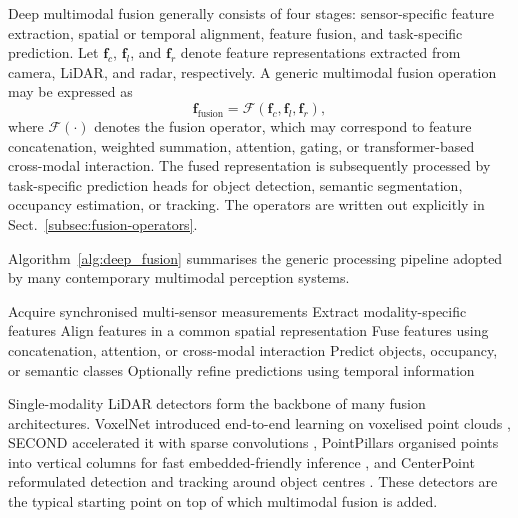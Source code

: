 Deep multimodal fusion generally consists of four stages: sensor-specific feature extraction, spatial or temporal alignment, feature fusion, and task-specific prediction. Let $\mathbf{f}_c$, $\mathbf{f}_l$, and $\mathbf{f}_r$ denote feature representations extracted from camera, LiDAR, and radar, respectively. A generic multimodal fusion operation may be expressed as
\begin{equation}
\mathbf{f}_{\mathrm{fusion}}
=
\mathcal{F}
\left(
\mathbf{f}_c,
\mathbf{f}_l,
\mathbf{f}_r
\right),
\label{eq:deep_fusion}
\end{equation}
where $\mathcal{F}(\cdot)$ denotes the fusion operator, which may correspond to feature concatenation, weighted summation, attention, gating, or transformer-based cross-modal interaction. The fused representation is subsequently processed by task-specific prediction heads for object detection, semantic segmentation, occupancy estimation, or tracking. The operators are written out explicitly in Sect.~\ref{subsec:fusion-operators}.

Algorithm~\ref{alg:deep_fusion} summarises the generic processing pipeline adopted by many contemporary multimodal perception systems.

\begin{algorithm}[t]
\caption{Generic Deep Multimodal Fusion Pipeline}
\label{alg:deep_fusion}
\begin{algorithmic}[1]
\State Acquire synchronised multi-sensor measurements
\State Extract modality-specific features
\State Align features in a common spatial representation
\State Fuse features using concatenation, attention, or cross-modal interaction
\State Predict objects, occupancy, or semantic classes
\State Optionally refine predictions using temporal information
\end{algorithmic}
\end{algorithm}

Single-modality LiDAR detectors form the backbone of many fusion architectures. VoxelNet introduced end-to-end learning on voxelised point clouds \cite{zhou2018_voxelnet}, SECOND accelerated it with sparse convolutions \cite{yan2018_second}, PointPillars organised points into vertical columns for fast embedded-friendly inference \cite{lang2019_pointpillars}, and CenterPoint reformulated detection and tracking around object centres \cite{yin2021_centerpoint}. These detectors are the typical starting point on top of which multimodal fusion is added.

